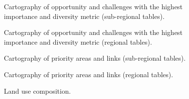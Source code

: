 {%


\begin{figure}[h!]
\caption{Cartography of opportunity and challenges  with the highest importance and diversity metric (sub-regional tables).}
\label{fig:reg_AC}
\end{figure}
\clearpage

\begin{figure}[h!]
\caption{Cartography of opportunity and challenges  with the highest importance and diversity metric (regional tables).}
\label{fig:trans_AC}
\end{figure}
\clearpage


\begin{figure}[h!]
\caption{Cartography of priority areas and links (sub-regional tables).}
\label{fig:reg}
\end{figure}
\clearpage

\begin{figure}[h!]
\caption{Cartography of priority areas and links (regional tables).}
\label{fig:trans}
\end{figure}
\clearpage


\begin{figure}[h!]
\caption{Land use composition.}
\label{fig:bar_chap2}
\end{figure}
\clearpage


}
